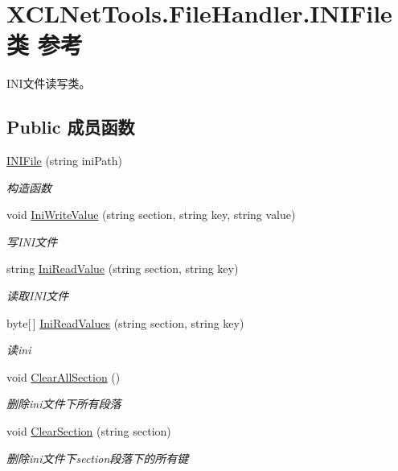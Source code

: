\hypertarget{class_x_c_l_net_tools_1_1_file_handler_1_1_i_n_i_file}{\section{X\-C\-L\-Net\-Tools.\-File\-Handler.\-I\-N\-I\-File类 参考}
\label{class_x_c_l_net_tools_1_1_file_handler_1_1_i_n_i_file}
}


I\-N\-I文件读写类。  


\subsection*{Public 成员函数}
\begin{DoxyCompactItemize}
\item 
\hyperlink{class_x_c_l_net_tools_1_1_file_handler_1_1_i_n_i_file_a2a9b574a2a6b3d747e388d555daa674a}{I\-N\-I\-File} (string ini\-Path)
\begin{DoxyCompactList}\small\item\em 构造函数 \end{DoxyCompactList}\item 
void \hyperlink{class_x_c_l_net_tools_1_1_file_handler_1_1_i_n_i_file_a4c03c9b5934c36418e0f980c149bb270}{Ini\-Write\-Value} (string section, string key, string value)
\begin{DoxyCompactList}\small\item\em 写\-I\-N\-I文件 \end{DoxyCompactList}\item 
string \hyperlink{class_x_c_l_net_tools_1_1_file_handler_1_1_i_n_i_file_a7268434ca0a7510cd59a2fb374ea61c1}{Ini\-Read\-Value} (string section, string key)
\begin{DoxyCompactList}\small\item\em 读取\-I\-N\-I文件 \end{DoxyCompactList}\item 
byte\mbox{[}$\,$\mbox{]} \hyperlink{class_x_c_l_net_tools_1_1_file_handler_1_1_i_n_i_file_a10f550948e2fd9f5b0edaca05091e234}{Ini\-Read\-Values} (string section, string key)
\begin{DoxyCompactList}\small\item\em 读ini \end{DoxyCompactList}\item 
void \hyperlink{class_x_c_l_net_tools_1_1_file_handler_1_1_i_n_i_file_abbd02c3619b105f9cf2746110300c48d}{Clear\-All\-Section} ()
\begin{DoxyCompactList}\small\item\em 删除ini文件下所有段落 \end{DoxyCompactList}\item 
void \hyperlink{class_x_c_l_net_tools_1_1_file_handler_1_1_i_n_i_file_a2fbd0075aa561f98ff86705d168839bc}{Clear\-Section} (string section)
\begin{DoxyCompactList}\small\item\em 删除ini文件下section段落下的所有键 \end{DoxyCompactList}\end{DoxyCompactItemize}
